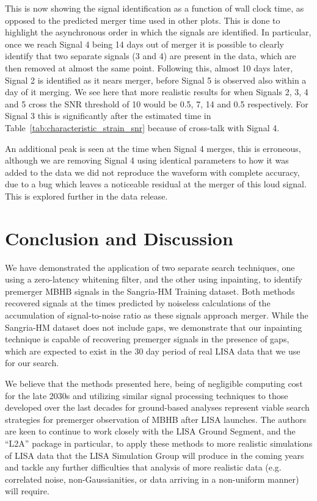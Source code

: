 \documentclass[%
 reprint,
superscriptaddress,
 nofootinbib,
 amsmath,amssymb,
 aps,
 prd,
]{revtex4-2}
\newcommand{\updated}[1]{#1}
\begin{document}
This is now showing the signal identification as a function of wall clock time, as opposed to the predicted merger time used in other plots.
This is done to highlight the asynchronous order in which the signals are identified.
In particular, once we reach Signal 4 being 14 days out of merger it is possible to clearly identify that two separate signals (3 and 4) are present in the data, which are then removed at almost the same point.
Following this, almost 10 days later, Signal 2 is identified as it nears merger, before Signal 5 is observed also within a day of it merging.
We see here that more realistic results for when Signals 2, 3, 4 and 5 cross the SNR threshold of 10 would be 0.5, 7, 14 and 0.5 respectively.
For Signal 3 this is significantly after the estimated time in Table~\ref{tab:characteristic_strain_snr} because of cross-talk with Signal 4.

\updated{An additional peak is seen at the time when Signal 4 merges, this is erroneous, although we are removing Signal 4 using identical parameters to how it was added to the data we did not reproduce the waveform with complete accuracy, due to a bug which leaves a noticeable residual at the merger of this loud signal.
This is explored further in the data release.}

\section{Conclusion and Discussion}
\label{sec:conclusion}

We have demonstrated the application of two separate search techniques, one using a zero-latency
whitening filter, and the other using inpainting, to identify premerger \ac{MBHB} signals in the Sangria-HM Training dataset.
Both methods recovered signals at the times predicted by noiseless calculations of the accumulation of signal-to-noise ratio as these signals approach merger.
While the Sangria-HM dataset does not include gaps, we demonstrate that our inpainting technique is capable of recovering premerger signals in the presence of gaps, which are expected to exist in the 30 day period of real LISA data that we use for our search.

We believe that the methods presented here, being of negligible computing cost for the late 2030s and utilizing similar signal processing techniques to those developed over the last decades for ground-based analyses represent viable search strategies for premerger observation of \ac{MBHB} after LISA launches.
The authors are keen to continue to work closely with the LISA Ground Segment, and the ``L2A'' package in particular, to apply these methods to more realistic simulations of LISA data that the LISA Simulation Group will produce in the coming years and tackle any further difficulties that analysis of more realistic data (e.g. correlated noise, non-Gaussianities, or data arriving in a non-uniform manner) will require.
\end{document}
